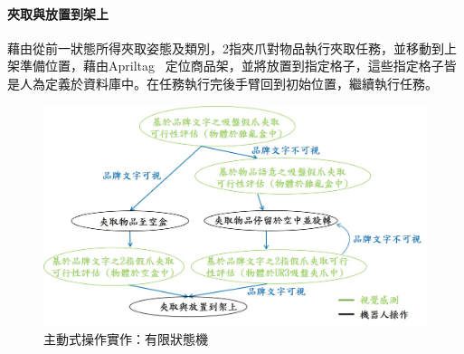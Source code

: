 \paragraph{夾取與放置到架上}
藉由從前一狀態所得夾取姿態及類別，2指夾爪對物品執行夾取任務，並移動到上架準備位置，藉由Apriltag ~\cite{olson2011apriltag}定位商品架，並將放置到指定格子，這些指定格子皆是人為定義於資料庫中。在任務執行完後手臂回到初始位置，繼續執行任務。


\begin{figure}[H]
	\centering
	\includegraphics[height=!, width=1.0\linewidth, keepaspectratio=true]
	{./figures/FSM.jpg}
  \caption{主動式操作實作：有限狀態機}
  \label{figure:fsm}
\end{figure}
